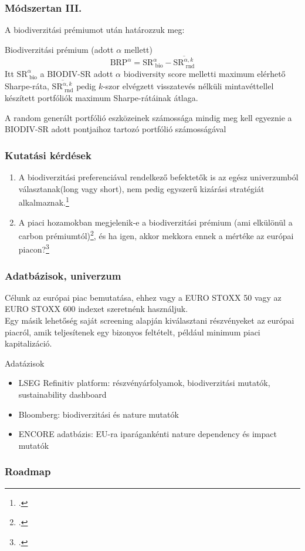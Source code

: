 \documentclass[aspectratio=169,notheorems]{corvinusmetropolis}
\begin{document}
\begin{frame}
  \frametitle{Módszertan III.}
  A biodiverzitási prémiumot \textcite{naffa_biodiversity_2024} után határozzuk meg:
  \begin{block}{Biodiverzitási prémium (adott $\alpha$ mellett)}
  \begin{equation}
    \text{BRP}^\alpha=\text{SR}^{\alpha}_{\text{ bio}} - \overline{\text{SR}^{\alpha, k}_{\text{ rnd}}}
  \end{equation}
  Itt $\text{SR}^{\alpha}_{\text{ bio}}$ a BIODIV-SR adott $\alpha$ biodiversity score melletti maximum elérhető Sharpe-ráta,
  $\overline{\text{SR}^{\alpha, k}_{\text{ rnd}}}$ pedig $k$-szor elvégzett visszatevés nélküli mintavéttellel készített portfóliók maximum Sharpe-rátáinak átlaga.
  \end{block}
  A random generált portfólió \alert{eszközeinek számossága mindig meg kell egyeznie} a BIODIV-SR adott pontjaihoz tartozó portfólió számosságával
\end{frame}

\begin{frame}
  \frametitle{Kutatási kérdések}
  \begin{enumerate}
    \item A biodiverzitási preferenciával rendelkező befektetők is az egész univerzumból választanak(long vagy short), nem pedig egyszerű kizárási stratégiát alkalmaznak.\footcite{pedersen_responsible_2021} 
    \item A piaci hozamokban megjelenik-e a biodiverzitási prémium (ami elkülönül a carbon prémiumtól)\footcite{coqueret_biodiversity_2024}, és ha igen, akkor mekkora ennek a mértéke az európai piacon?\footcite{naffa_biodiversity_2024}
  \end{enumerate}
\end{frame}

\begin{frame}
  \frametitle{Adatbázisok, univerzum}
  Célunk az európai piac bemutatása, ehhez vagy a \alert{EURO STOXX 50} vagy az \alert{EURO STOXX 600} indexet szeretnénk használjuk.\\
   Egy másik lehetőség \alert{saját screening alapján} kiválasztani részvényeket az európai piacról, amik \alert{teljesítenek egy bizonyos feltételt}, például minimum piaci kapitalizáció.\\
  \medskip
  \begin{block}{Adatázisok}
    \begin{itemize}
    \item \alert{LSEG Refinitiv platform}: részvényárfolyamok, biodiverzitási mutatók, sustainability dashboard
    \item \alert{Bloomberg}: biodiverzitási és nature mutatók
      \item \alert{ENCORE adatbázis}: EU-ra iparágankénti nature dependency és impact mutatók
    \end{itemize}
  \end{block}
\end{frame}

\begin{frame}
  \frametitle{Roadmap}
\end{frame}

\end{document}
